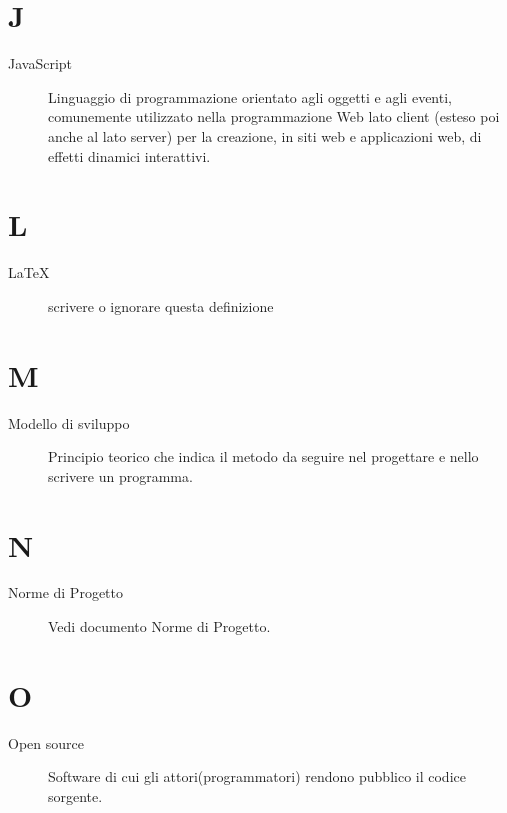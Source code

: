 \documentclass{article}
\begin{document}
\section{J}
\begin{description}
  \item[JavaScript] Linguaggio di programmazione orientato agli oggetti e agli eventi, comunemente utilizzato nella programmazione Web lato client (esteso poi anche al lato server) per la creazione, in siti web e applicazioni web, di effetti dinamici interattivi.
\end{description}
\newpage
\section{L}
\begin{description}
  \item[LaTeX] {scrivere o ignorare questa definizione}
\end{description}
\newpage
\section{M}
\begin{description}
  \item[Modello di sviluppo] Principio teorico che indica il metodo da seguire nel progettare e nello scrivere un programma.
\end{description}
\newpage
\section{N}
\begin{description}
  \item[Norme di Progetto] Vedi documento Norme di Progetto.
\end{description}
\newpage
\section{O}
\begin{description}
  \item[Open source] Software di cui gli attori(programmatori) rendono pubblico il codice sorgente.
\end{description}
\newpage
\end{document}
